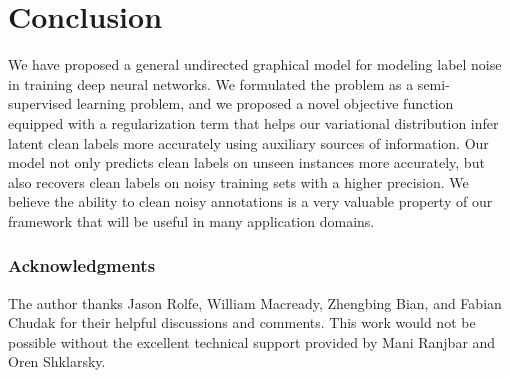 \documentclass{article}
\newcommand{\x}{{\pmb{x}}}
\newcommand{\y}{{\pmb{y}}}
\newcommand{\yh}{{\hat{\pmb{y}}}}
\newcommand{\h}{{\pmb{h}}}
\newcommand{\btheta}{{\pmb{\theta}}}
\begin{document}
\section{Conclusion}
We have proposed a general undirected graphical model for modeling label noise in training deep neural networks. 
We formulated the problem as a semi-supervised learning problem, and we proposed
a novel objective function equipped with a regularization term that helps our variational distribution infer latent clean labels
more accurately using auxiliary sources of information. Our model not only predicts clean labels on unseen instances more accurately,
but also recovers clean labels on noisy training sets with a higher precision.
We believe the ability to clean
noisy annotations is a very valuable property of our framework that will be useful in many application domains.

\subsubsection*{Acknowledgments}
The author thanks Jason Rolfe, William Macready, Zhengbing Bian, and Fabian Chudak for their helpful discussions and comments. This work would not be
possible without the excellent technical support provided by Mani Ranjbar and Oren Shklarsky.

\small


\appendix
\iffalse
\section{Visualization}
As shown in the E step in Sec. 3.3, the variational distribution $q$ infers latent clean labels by combining information from both the image-based CRF-CNN model $p_\btheta(\yh, \h| \y, \x)$ 
and the label-based auxiliary distribution $p^{\alpha}_{aux}(\yh, \h| \y)$. In our experiments, we observe that in general $q$ proposes clean labels more accurately than the auxiliary distribution. 
Fig.~\ref{fig:coco_res} compares $q$ against $p_{aux}$ in terms of its ability to infer clean labels for a few instances in the noisy training set ($D_N$) for the COCO experiment
with actual Flickr tags. In Fig.~\ref{fig:cifar_res}, examples of the recovered clean labels are visualized for the CIFAR-10 experiment.
\fi
\end{document}
